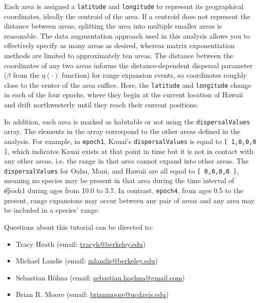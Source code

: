 Each area is assigned a {\tt latitude} and {\tt longitude} to represent its geographical coordinates, ideally the centroid of the area.
If a centroid does not represent the distance between areas, splitting the area into multiple smaller areas is reasonable.
The data augmentation approach used in this analysis allows you to effectively specify as many areas as desired, whereas matrix exponentiation methods are limited to approximately ten areas.
The distance between the coordinates of any two areas informs the distance-dependent dispersal parameter ($\beta$ from the $\eta(\cdot)$ function) for range expansion events, so coordinates roughly close to the center of the area suffice.
Here, the {\tt latitude} and {\tt longitude} change in each of the four epochs, where they begin at the current location of Hawaii and drift northwesterly until they reach their current positions.

In addition, each area is marked as habitable or not using the {\tt dispersalValues} array.
The elements in the array correspond to the other areas defined in the analysis.
For example, in {\tt epoch1}, Kauai's {\tt dispersalValues} is equal to {\tt [ 1,0,0,0 ]}, which indicates Kauai exists at that point in time but it is not in contact with any other areas, i.e. the range in that area cannot expand into other areas.
The {\tt dispersalValues} for Oahu, Maui, and Hawaii are all equal to {\tt [ 0,0,0,0 ]}, meaning no species may be present in that area during the time interval of {\t epoch1} during ages from 10.0 to 3.7. In contrast, {\tt epoch4}, from ages 0.5 to the present, range expansions may occur between any pair of areas and any area may be included in a species' range.


\vspace{5cm}
Questions about this tutorial can be directed to: \\\vspace{-10mm}
\begin{itemize}
\item Tracy Heath (email: \href{mailto:tracyh@berkeley.edu}{tracyh@berkeley.edu}) \\\vspace{-8mm}
\item Michael Landis (email: \href{mailto:mlandis@berkeley.edu}{mlandis@berkeley.edu}) \\\vspace{-8mm} 
\item Sebastian H\"{o}hna (email: \href{mailto:sebastian.hoehna@gmail.com}{sebastian.hoehna@gmail.com}) \\\vspace{-8mm}
\item Brian R. Moore (email: \href{mailto:brianmoore@ucdavis.edu}{brianmoore@ucdavis.edu}) \\\vspace{-8mm}
\end{itemize}




